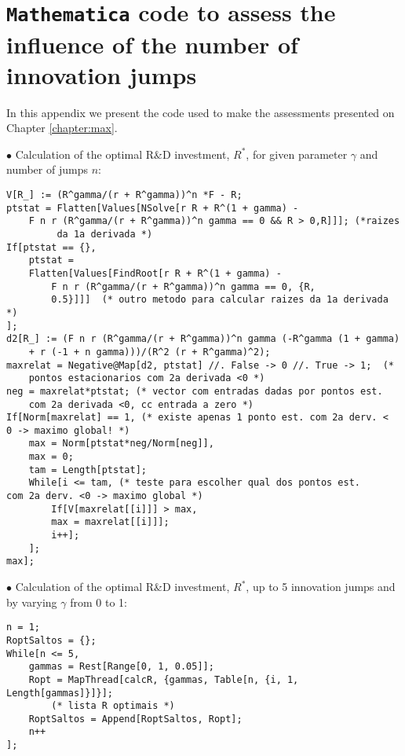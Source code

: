 
\chapter{\texttt{Mathematica} code to assess the influence of the number of innovation jumps}
\label{chapter:appendixjump}

In this appendix we present the code used to make the assessments presented on Chapter \ref{chapter:max}.
\vspace{0.5cm}

$\bullet$ Calculation of the optimal R\&D investment, $R^*$, for given parameter $\gamma$ and number of jumps $n$:
\begin{lstlisting}
V[R_] := (R^gamma/(r + R^gamma))^n *F - R;
ptstat = Flatten[Values[NSolve[r R + R^(1 + gamma) - 
	F n r (R^gamma/(r + R^gamma))^n gamma == 0 && R > 0,R]]]; (*raizes
		 da 1a derivada *)
If[ptstat == {},
	ptstat = 
	Flatten[Values[FindRoot[r R + R^(1 + gamma) -
		F n r (R^gamma/(r + R^gamma))^n gamma == 0, {R, 
		0.5}]]]  (* outro metodo para calcular raizes da 1a derivada *)
];
d2[R_] := (F n r (R^gamma/(r + R^gamma))^n gamma (-R^gamma (1 + gamma) 
	+ r (-1 + n gamma)))/(R^2 (r + R^gamma)^2);
maxrelat = Negative@Map[d2, ptstat] //. False -> 0 //. True -> 1;  (* 
	pontos estacionarios com 2a derivada <0 *)
neg = maxrelat*ptstat; (* vector com entradas dadas por pontos est. 
	com 2a derivada <0, cc entrada a zero *)
If[Norm[maxrelat] == 1, (* existe apenas 1 ponto est. com 2a derv. <
0 -> maximo global! *)
	max = Norm[ptstat*neg/Norm[neg]],
	max = 0;
	tam = Length[ptstat];
	While[i <= tam, (* teste para escolher qual dos pontos est. 
com 2a derv. <0 -> maximo global *)
		If[V[maxrelat[[i]]] > max,
		max = maxrelat[[i]]];
		i++];
	];
max];
\end{lstlisting}


\vspace{3mm}
$\bullet$ Calculation of the optimal R\&D investment, $R^*$, up to 5 innovation jumps and by varying $\gamma$ from 0 to 1:

\begin{lstlisting}
n = 1;
RoptSaltos = {};
While[n <= 5,
	gammas = Rest[Range[0, 1, 0.05]];
	Ropt = MapThread[calcR, {gammas, Table[n, {i, 1, Length[gammas]}]}];
		(* lista R optimais *)
	RoptSaltos = Append[RoptSaltos, Ropt];
	n++
];
\end{lstlisting}
